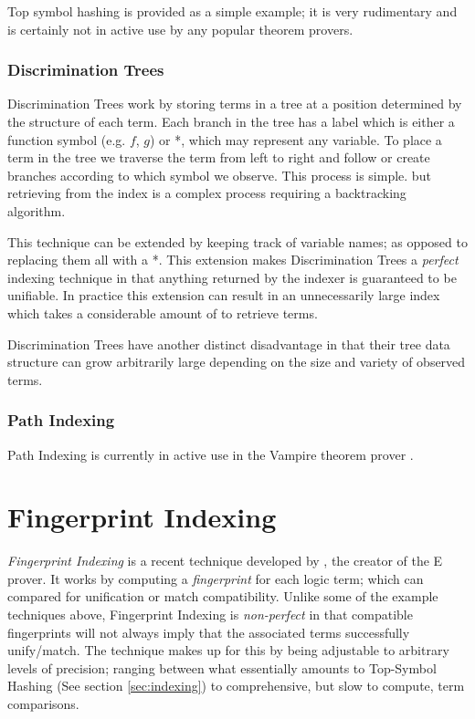 Top symbol hashing is provided as a simple example; it is very rudimentary and
is certainly not in active use by any popular theorem provers.

\subsubsection{Discrimination Trees}

Discrimination Trees work by storing terms in a tree at a position determined by the structure
of each term. Each branch in the tree has a label which is either a function symbol
(e.g. $f$, $g$) or *, which may represent any variable. To place a term in the tree
we traverse the term from left to right and follow or create branches according to
which symbol we observe. This process is simple. but retrieving from the index is a
complex process requiring a backtracking algorithm.

This technique can be extended by keeping track of variable names; as opposed to
replacing them all with a *. This extension makes Discrimination Trees a \emph{perfect} indexing technique in that anything
returned by the indexer is guaranteed to be unifiable\cite{mccune}. In practice
this extension can result in an unnecessarily large index which takes
a considerable amount of to retrieve terms.

Discrimination Trees have another distinct disadvantage in that their tree data
structure can grow arbitrarily large depending on the size and variety of observed terms.

\subsubsection{Path Indexing}

Path Indexing is currently in active use in the Vampire theorem prover \cite{vampire}.

\section{Fingerprint Indexing}
\label{sec:fingerprint}

\emph{Fingerprint Indexing} is a recent technique developed by , the creator
of the E prover. It works by computing a \emph{fingerprint} for each logic term;
which can compared for unification or match compatibility. 
Unlike some of the example techniques above,
Fingerprint Indexing is \emph{non-perfect} in that compatible fingerprints will not
always imply that the associated terms successfully unify/match. The technique
makes up for this by being adjustable to arbitrary levels of precision; ranging between
what essentially amounts to Top-Symbol Hashing (See section \ref{sec:indexing})
to comprehensive, but slow to compute, term comparisons.

